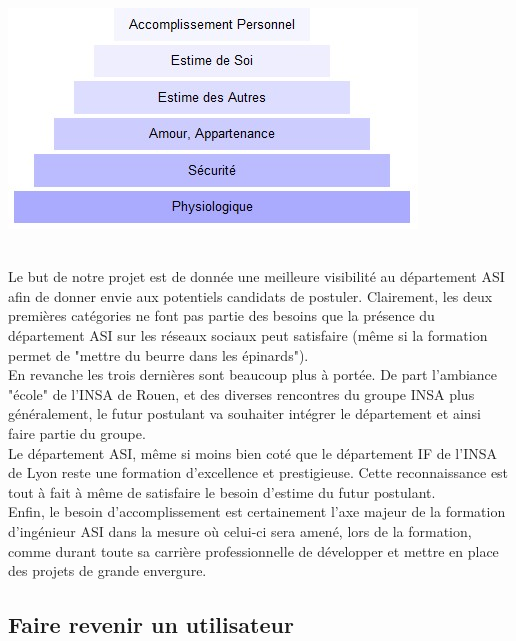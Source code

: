 \begin{center}
\includegraphics[scale=0.5]{./image/pyramidemaslow.jpg}
\end{center}
~~\\
\indent Le but de notre projet est de donnée une meilleure visibilité au département ASI afin de donner envie aux potentiels candidats de postuler. Clairement, les deux premières catégories ne font pas partie des besoins que la présence du département ASI sur les réseaux sociaux peut satisfaire (même si la formation permet de "mettre du beurre dans les épinards"). ~~\\
\indent En revanche les trois dernières sont beaucoup plus à portée. 
\indent De part l'ambiance "école" de l'INSA de Rouen, et des diverses rencontres du groupe INSA plus généralement, le futur postulant va souhaiter intégrer le département et ainsi faire partie du groupe. ~~\\
\indent Le département ASI, même si moins bien coté que le département IF de l'INSA de Lyon reste une formation d'excellence et prestigieuse. Cette reconnaissance est tout à fait à même de satisfaire le besoin d'estime du futur postulant. ~~\\
\indent Enfin, le besoin d'accomplissement est certainement l'axe majeur de la formation d'ingénieur ASI dans la mesure où celui-ci sera amené, lors de la formation, comme durant toute sa carrière professionnelle de développer et mettre en place des projets de grande envergure.

\subsection{Faire revenir un utilisateur}

